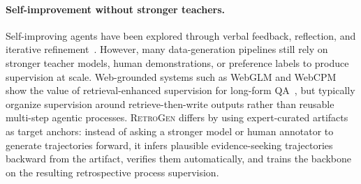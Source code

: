 \paragraph{Self-improvement without stronger teachers.}
Self-improving agents have been explored through verbal feedback, reflection, and iterative refinement~\citep{shinn2023reflexion}. However, many data-generation pipelines still rely on stronger teacher models, human demonstrations, or preference labels to produce supervision at scale. Web-grounded systems such as WebGLM and WebCPM show the value of retrieval-enhanced supervision for long-form QA~\citep{liu2023webglm,qin2023webcpm}, but typically organize supervision around retrieve-then-write outputs rather than reusable multi-step agentic processes. \textsc{RetroGen} differs by using expert-curated artifacts as target anchors: instead of asking a stronger model or human annotator to generate trajectories forward, it infers plausible evidence-seeking trajectories backward from the artifact, verifies them automatically, and trains the backbone on the resulting retrospective process supervision.